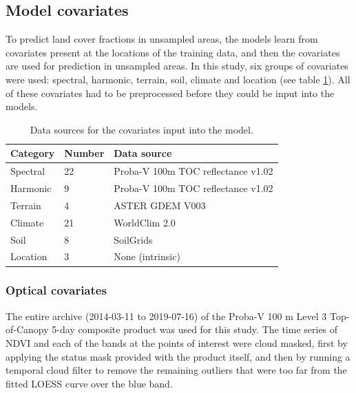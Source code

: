 \documentclass[a4paper,10pt]{article}
\begin{document}
\subsection{Model covariates}

To predict land cover fractions in unsampled areas, the models learn from covariates present at the locations of the training data, and then the covariates are used for prediction in unsampled areas.
In this study, six groups of covariates were used: spectral, harmonic, terrain, soil, climate and location (see table \ref{tab-inputdata}).
All of these covariates had to be preprocessed before they could be input into the models.

\begin{table}
\centering
    \begin{tabular}{llp{6cm}}
         \toprule
         \textbf{Category} & \textbf{Number} & \textbf{Data source} \\
         \midrule
         Spectral & 22 & Proba-V 100m \ac{TOC} reflectance v1.02 \citep{probavguide2} \\
         Harmonic & 9 & Proba-V 100m \ac{TOC} reflectance v1.02 \citep{probavguide2} \\
         Terrain & 4 & ASTER GDEM V003 \citep{ASTGTM003} \\
         Climate & 21 & WorldClim 2.0 \citep{worldclim2} \\
         Soil & 8 & SoilGrids \citep{hengl_soilgrids250m_2017} \\
         Location & 3 & None (intrinsic) \\
         \bottomrule
    \end{tabular}
    \label{tab-inputdata}
    \caption{Data sources for the covariates input into the model.}
\end{table}

\subsubsection{Optical covariates}

The entire archive (2014-03-11 to 2019-07-16) of the Proba-V 100 m Level 3 Top-of-Canopy 5-day composite product \citep{probavguide2} was used for this study.
The time series of NDVI and each of the bands at the points of interest were cloud masked, first by applying the status mask provided with the product itself, and then by running a temporal cloud filter to remove the remaining outliers that were too far from the fitted \ac{LOESS} curve over the blue band.
\end{document}
